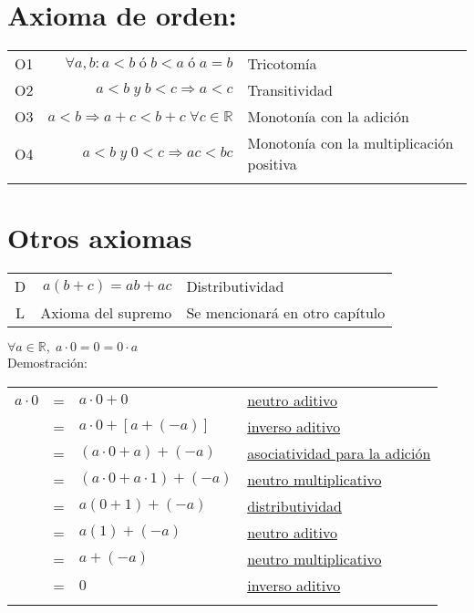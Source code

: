 \section{Axioma de orden:}
\begin{center}
\begin{tabular}{c r l}
O1&$\forall a, b : a < b \; ó \; b < a \; ó \; a=b$&Tricotomía\\ \label{O1}
O2&$a < b \; y \; b < c \Rightarrow a<c$&Transitividad\\ \label{O2}
O3&$a<b \Rightarrow a+c<b+c \;  \forall c \in \mathbb{R}$&Monotonía con la adición\\ \label{O3}
O4&$a < b \; y \; 0<c \Rightarrow ac < bc$&Monotonía con la multiplicación positiva\\ \label{O4}
\end{tabular}
\end{center}

\section{Otros axiomas}
\begin{center}
\begin{tabular}{c r l}
D&$a(b+c)=ab+ac$&Distributividad\\ \label{D}
L&Axioma del supremo&Se mencionará en otro capítulo\\
\end{tabular}
\end{center}


\begin{teo}$\forall a \in \mathbb{R},\; a\cdot 0 = 0 = 0 \cdot a$\\ \label{teo 1.1.1}
Demostración:
\hspace{0.3cm}
\begin{center}
\begin{tabular}{r c l  l}
$a\cdot 0$&=&$a\cdot 0 + 0$&\hyperref[A4]{neutro aditivo}\\
&=&$a\cdot 0 + \left[ a + (-a)\right]$&\hyperref[A5]{inverso aditivo}\\
&=&$\left( a\cdot 0 +  a \right) + (-a)$&\hyperref[A3]{asociatividad para la adición}\\
&=&$\left( a\cdot 0 +  a \cdot 1 \right) + (-a)$&\hyperref[M4]{neutro multiplicativo}\\
&=&$a(0+1)+(-a)$&\hyperref[D]{distributividad}\\
&=&$a(1)+(-a)$&\hyperref[A4]{neutro aditivo}\\
&=&$a+(-a)$&\hyperref[M4]{neutro multiplicativo}\\
&=&$0$&\hyperref[M5]{inverso aditivo}\\\\
\end{tabular}
\end{center}
\end{teo}


